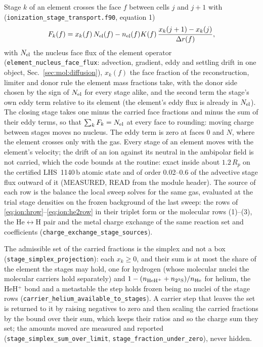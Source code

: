 Stage $k$ of an element crosses the face $f$ between cells $j$ and $j+1$ with
(\texttt{ionization\_stage\_transport.f90}, equation 1)
\begin{equation}
F_k(f) = x_k(f)\,N_{\rm el}(f)
 - n_{\rm el}(f)K(f)\,\frac{x_k(j+1)-x_k(j)}{\Delta r(f)},
\label{eq:ion:stageflux}
\end{equation}
with $N_{\rm el}$ the nucleus face flux of the element operator
(\texttt{element\_nucleus\_face\_flux}: advection, gradient, eddy and settling
drift in one object, Sec.~\ref{sec:mol:diffusion}), $x_k(f)$ the face
fraction of the reconstruction, limiter and donor rule the element mass
fractions take, with the donor side chosen by the sign of $N_{\rm el}$ for
every stage alike, and the second term the stage's own eddy term relative to
its element (the element's eddy flux is already in $N_{\rm el}$). The closing
stage takes one minus the carried face fractions and minus the sum of their
eddy terms, so that $\sum_k F_k = N_{\rm el}$ at every face to rounding:
moving charge between stages moves no nucleus. The eddy term is zero at faces
0 and $N$, where the element crosses only with the gas. Every stage of an
element moves with the element's velocity; the drift of an ion against its
neutral in the ambipolar field is not carried, which the code bounds at the
routine: exact inside about $1.2\,R_p$ on the certified LHS~1140\,b atomic
state and of order 0.02--0.6 of the advective stage flux outward of it
(MEASURED, READ from the module header). The source of each row is the
balance the local sweep solves for the same gas, evaluated at the trial stage
densities on the frozen background of the last sweep: the rows of
\eqref{eq:ion:hrow}--\eqref{eq:ion:he2row} in their triplet form or the
molecular rows (1)--(3), the He$\leftrightarrow$H pair and the metal charge
exchange of the same reaction set and coefficients
(\texttt{charge\_exchange\_stage\_sources}).

The admissible set of the carried fractions is the simplex and not a box
(\texttt{stage\_simplex\_projection}): each $x_k\ge0$, and their sum is at
most the share of the element the stages may hold, one for hydrogen (whose
molecular nuclei the molecular carriers hold separately) and
$1-(n_{\rm HeH^+}+n_{2^3{\rm S}})/n_{\rm He}$ for helium, the HeH$^+$ bond and
a metastable the step holds frozen being no nuclei of the stage rows
(\texttt{carrier\_helium\_available\_to\_stages}). A carrier step that leaves
the set is returned to it by raising negatives to zero and then scaling the
carried fractions by the bound over their sum, which keeps their ratios and
so the charge sum they set; the amounts moved are measured and reported
(\texttt{stage\_simplex\_sum\_over\_limit}, \texttt{stage\_fraction\_under\_zero}),
never hidden.

